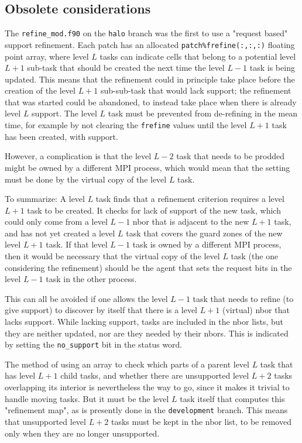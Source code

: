 \documentclass[paper=a4,fontsize=11pt]{scrartcl}
\numberwithin{equation}{section}		%
\numberwithin{figure}{section}			%
\numberwithin{table}{section}				%
\newcommand{\gitcolor}{\color{Brown}}
\newcommand{\codecolor}{\color{Blue}}
\newcommand{\filecolor}{\color{NavyBlue}}
\newcommand{\Git}[1]{\texttt{\gitcolor #1}}
\newcommand{\File}[1]{{\filecolor\texttt{#1}}}
\newcommand{\Code}[1]{{\codecolor\texttt{#1}}}
\begin{document}
\subsection{Obsolete considerations}
The \File{refine\_mod.f90} on the \Git{halo} branch was the first to use a "request based" support refinement.  Each patch has an allocated \Code{patch\%frefine(:,:,:)} floating point array, where level $L$ tasks can indicate cells that belong to a potential level $L+1$  sub-task that should be created the next time the level $L-1$ task is being updated.  This means that the refinement could in principle take place before the creation of the level $L+1$ sub-sub-task that would lack support; the refinement that was started could be abandoned, to instead take place when there is already level $L$ support.  The level $L$ task must be prevented from de-refining in the mean time, for example by not clearing the \Code{frefine} values until the level $L+1$ task has been created, with support.

However, a complication is that the level $L-2$ task that needs to be prodded might be owned by a different MPI process, which would mean that the setting must be done by the virtual copy of the level $L$ task.

To summarize:  A level $L$ task finds that a refinement criterion requires a level $L+1$ task to be created.  It checks for lack of support of the new task, which could only come from a level $L-1$ nbor that is adjacent to the new $L+1$ task, and has not yet created a level $L$ task that covers the guard zones of the new level $L+1$ task.  If that level $L-1$ task is owned by a different MPI process, then it would be necessary that the virtual copy of the level $L$ task (the one considering the refinement) should be the agent that sets the request bits in the level $L-1$ task in the other process.

This can all be avoided if one allows the level $L-1$ task that needs to refine (to give support) to discover by itself that there is a level $L+1$ (virtual) nbor that lacks support.  While lacking support, tasks are included in the nbor lists, but they are neither updated, nor are they needed by their nbors.   This is indicated by setting the \Code{no\_support} bit in the status word.

The method of using an array to check which parts of a parent level $L$ task that has level $L+1$ child tasks, and whether there are unsupported level $L+2$ tasks overlapping its interior is nevertheless the way to go, since it makes it trivial to handle moving tasks.  But it must be the level $L$ task itself that computes this "refinement map", as is presently done in the \Git{development} branch.  This means that unsupported level $L+2$ tasks must be kept in the nbor list, to be removed only when they are no longer unsupported.
\end{document}
